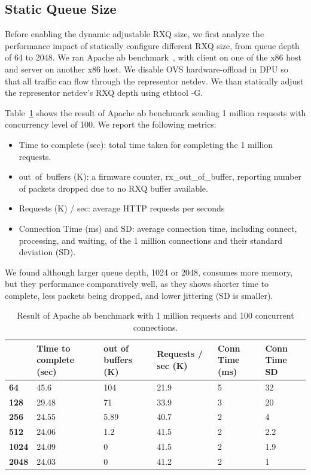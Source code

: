\documentclass[letterpaper]{article}
\begin{document}
\subsection{Static Queue Size}
Before enabling the dynamic adjustable RXQ size, we first analyze the performance impact
of statically configure different RXQ size, from queue depth of 64 to 2048.
We ran Apache ab benchmark~\cite{ab}, with client on one of the x86 host and
server on another x86 host. We disable OVS hardware-offload in DPU so that all traffic
can flow through the representor netdev. We than statically adjust the representor
netdev's RXQ depth using ethtool -G. 

Table~\ref{tab:ab1} shows the result of Apache ab benchmark sending 1 million requests
with concurrency level of 100. We report the following metrics:
\begin{itemize}
    \item Time to complete (sec): total time taken for completing the 1 million requests.
    \item out\ of\ buffers (K): a firmware counter, rx\_out\_of\_buffer, reporting number of packets dropped due to no RXQ buffer available.
    \item Requests (K) / sec: average HTTP requests per seconds
    \item Connection Time (ms) and SD: average connection time, including connect, processing, and waiting, of the 1 million connections and their standard deviation (SD).
\end{itemize}
We found although larger queue depth, 1024 or 2048, consumes more memory, but they
performance comparatively well, as they shows shorter time to complete, less packets
being dropped, and lower jittering (SD is smaller).

\begin{table}[h!]
\centering
\footnotesize
\begin{tabular}{|p{0.6cm}|p{1.2cm}|p{1.2cm}|p{1.2cm}|p{0.8cm}|p{1cm}|} \hline
\textbf{} & \textbf{Time to complete (sec)} & \textbf{out of buffers (K)} & \textbf{Requests / sec (K)} & \textbf{Conn Time (ms)} & \textbf{Conn Time SD} \\ \hline \hline
\textbf{64}   & 45.6  & 104   & 21.9 & 5 & 32  \\ \hline
\textbf{128}  & 29.48 & 71    & 33.9 & 3 & 20  \\ \hline \hline
\textbf{256}  & 24.55 & 5.89  & 40.7 & 2 & 4   \\ \hline
\textbf{512}  & 24.06 & 1.2   & 41.5 & 2 & 2.2 \\ \hline
\textbf{1024} & 24.09 & 0     & 41.5 & 2 & 1.9 \\ \hline
\textbf{2048} & 24.03 & 0     & 41.2 & 2 & 1   \\ \hline
\end{tabular}
\caption{Result of Apache ab benchmark with 1 million requests and 100 concurrent connections.}
\label{tab:ab1}
\end{table}
\end{document}
